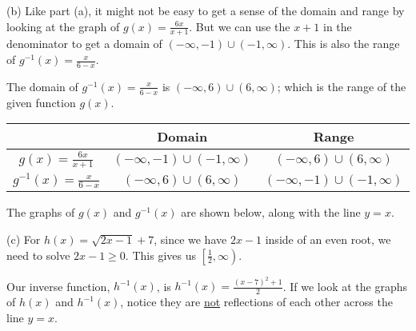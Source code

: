 \begin{solution}
(b) Like part (a), it might not be easy to get a sense of the domain and range by looking at the graph of $g(x) = \frac{6x}{x+1}$. But we can use the $x+1$ in the denominator to get a domain of $(-\infty, -1) \cup (-1, \infty)$. This is also the range of $g^{-1}(x) = \frac{x}{6-x}$. \newline 

The domain of $g^{-1}(x) = \frac{x}{6-x}$ is $(-\infty, 6) \cup (6, \infty)$; which is the range of the given function $g(x)$.

\begin{center}
\begin{tabular}{c|c|c}  
     & Domain & Range \\ \hline 
     $g(x)=\frac{6x}{x+1}$ & \cellcolor{yellow} $(-\infty, -1) \cup (-1, \infty)$ & \cellcolor{green} $(-\infty, 6) \cup (6, \infty)$ \\[4pt] \hline 
     $g^{-1}(x) = \frac{x}{6-x}$ & \cellcolor{green} $(-\infty, 6) \cup (6, \infty)$ & \cellcolor{yellow} $(-\infty, -1) \cup (-1, \infty)$ \\[4pt]
\end{tabular}
\end{center}

\vspace{0.25in}

The graphs of $g(x)$ and $g^{-1}(x)$ are shown below, along with the line $y = x$.

\begin{center}
\end{center}

(c) For $h(x) = \sqrt{2x-1}+7$, since we have $2x-1$ inside of an even root, we need to solve $2x-1 \geq 0$. This gives us $\left[\frac{1}{2}, \infty\right)$. \newline 

Our inverse function, $h^{-1}(x)$, is $h^{-1}(x) = \frac{(x-7)^2+1}{2}$. If we look at the graphs of $h(x)$ and $h^{-1}(x)$, notice they are \underline{not} reflections of each other across the line $y = x$. \newline 


\end{solution}
